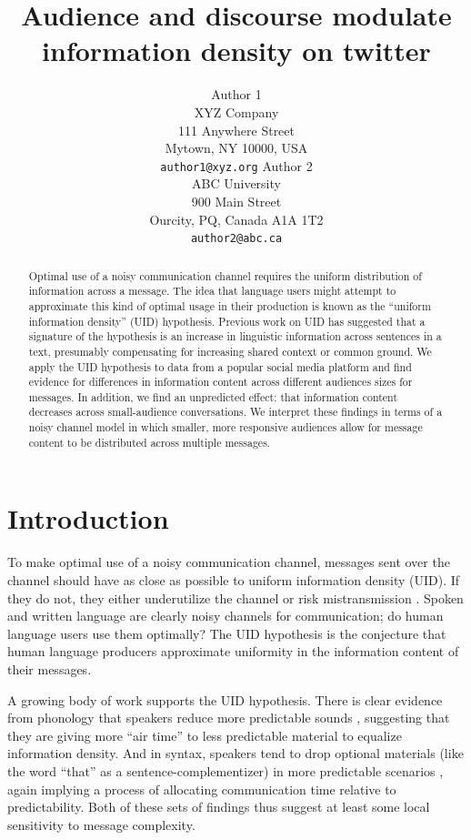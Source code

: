 \documentclass[11pt,letterpaper]{article}
\title{Audience and discourse modulate information density on twitter 
\Thanks{Thanks to...}}
\author{Author 1\\
XYZ Company\\
111 Anywhere Street\\
Mytown, NY 10000, USA\\
{\tt author1@xyz.org}
	  \And
          Author 2\\
ABC University\\
900 Main Street\\
Ourcity, PQ, Canada A1A 1T2\\
{\tt author2@abc.ca}
}
\date{}
\begin{document}
\maketitle
\begin{abstract}
Optimal use of a noisy communication channel requires the uniform distribution of information across a message. The idea that language users might attempt to approximate this kind of optimal usage in their production is known as the ``uniform information density'' (UID) hypothesis. Previous work on UID has suggested that a signature of the hypothesis is an  increase in linguistic information across sentences in a text, presumably compensating for increasing shared context or common ground. We apply the UID hypothesis to data from a popular social media platform and find evidence for differences in information content across different audiences sizes for messages. In addition, we find an unpredicted effect: that information content decreases across small-audience conversations. We interpret these findings in terms of a noisy channel model in which smaller, more responsive audiences allow for message content to be distributed across multiple messages. 


\end{abstract}

\section{Introduction}

To make optimal use of a noisy communication channel, messages sent over the channel should have as close as possible to uniform information density (UID). If they do not, they either underutilize the channel or risk mistransmission \cite{levy2007}. Spoken and written language are clearly noisy channels for communication; do human language users use them optimally? The UID hypothesis is the conjecture that human language producers approximate uniformity in the information content of their messages. 
 
A growing body of work supports the UID hypothesis. There is clear evidence from phonology that speakers reduce more predictable sounds \cite{aylett2004,aylett2006,bell2003}, suggesting that they are giving more ``air time'' to less predictable material to equalize information density. And in syntax, speakers tend to drop optional materials (like the word ``that'' as a sentence-complementizer) in more predictable scenarios \cite{levy2007,frank2008,jaeger2010}, again implying a process of allocating communication time relative to predictability. Both of these sets of findings thus suggest at least some local sensitivity to message complexity.
\end{document}
